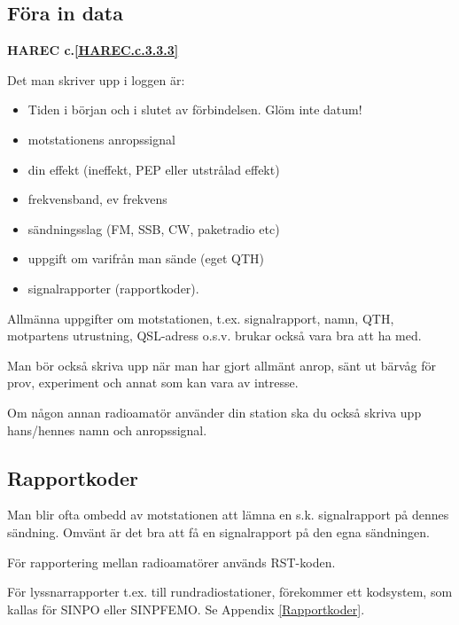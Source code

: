 \subsection{Föra in data}
\textbf{HAREC
  c.\ref{HAREC.c.3.3.3}\label{myHAREC.c.3.3.3}
}

Det man skriver upp i loggen är:
\begin{itemize}
  \item Tiden i början och i slutet av förbindelsen. Glöm inte datum!
  \item motstationens anropssignal
  \item din effekt (ineffekt, PEP eller utstrålad effekt)
  \item frekvensband, ev frekvens
  \item sändningsslag (FM, SSB, CW, paketradio etc)
  \item uppgift om varifrån man sände (eget QTH)
  \item signalrapporter (rapportkoder).
\end{itemize}

Allmänna uppgifter om motstationen, t.ex. signalrapport, namn, QTH,
motpartens utrustning, QSL-adress o.s.v. brukar också vara bra att ha med.

Man bör också skriva upp när man har gjort allmänt anrop, sänt ut
bärvåg för prov, experiment och annat som kan vara av intresse.

Om någon annan radioamatör använder din station ska du också skriva
upp hans/hennes namn och anropssignal.

\subsection{Rapportkoder}

Man blir ofta ombedd av motstationen att lämna en s.k. signalrapport på dennes
sändning.
Omvänt är det bra att få en signalrapport på den egna sändningen.

För rapportering mellan radioamatörer används RST-koden.

För lyssnarrapporter t.ex. till rundradiostationer, förekommer ett
kodsystem, som kallas för SINPO eller SINPFEMO. Se Appendix \ref{Rapportkoder}.

